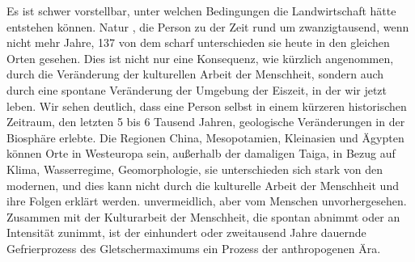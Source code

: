 \documentclass[11pt,a4paper]{book}
\begin{document}
Es ist schwer vorstellbar, unter welchen Bedingungen die Landwirtschaft hätte entstehen können. Natur , die Person zu der Zeit rund um zwanzigtausend, wenn nicht mehr Jahre, 137 von dem scharf unterschieden sie heute in den gleichen Orten gesehen. Dies ist nicht nur eine Konsequenz, wie kürzlich angenommen, durch die Veränderung der kulturellen Arbeit der Menschheit, sondern auch durch eine spontane Veränderung der Umgebung der Eiszeit, in der wir jetzt leben. Wir sehen deutlich, dass eine Person selbst in einem kürzeren historischen Zeitraum, den letzten 5 bis 6 Tausend Jahren, geologische Veränderungen in der Biosphäre erlebte. Die Regionen China, Mesopotamien, Kleinasien und Ägypten können Orte in Westeuropa sein, außerhalb der damaligen Taiga, in Bezug auf Klima, Wasserregime, Geomorphologie, sie unterschieden sich stark von den modernen, und dies kann nicht durch die kulturelle Arbeit der Menschheit und ihre Folgen erklärt werden. unvermeidlich, aber vom Menschen unvorhergesehen. Zusammen mit der Kulturarbeit der Menschheit, die spontan abnimmt oder an Intensität zunimmt, ist der einhundert oder zweitausend Jahre dauernde Gefrierprozess des Gletschermaximums ein Prozess der anthropogenen Ära.
\end{document}
